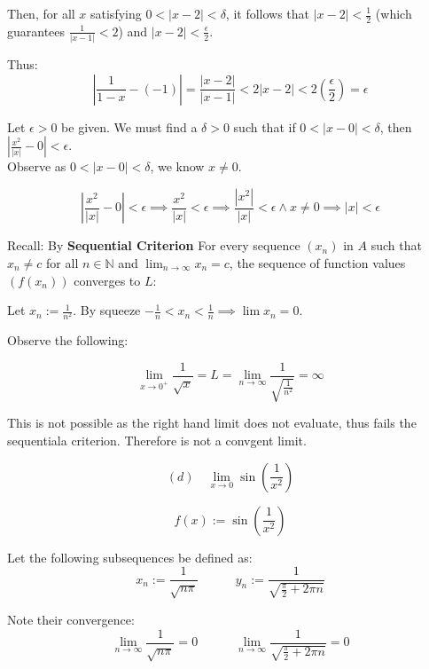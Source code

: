 Then, for all $x$ satisfying $0 < |x-2| < \delta$, it follows that $|x-2| < \frac{1}{2}$ (which guarantees $\frac{1}{|x-1|} < 2$) and $|x-2| < \frac{\epsilon}{2}$.

Thus:
\[
	\left| \frac{1}{1-x} - (-1) \right| = \frac{|x-2|}{|x-1|} < 2|x-2| < 2\left(\frac{\epsilon}{2}\right) = \epsilon
\]

\qq


Let $\epsilon > 0$ be given. We must find a $\delta > 0$ such that if $0 < |x-0| < \delta$, then $\left| \frac{x^2}{|x|} - 0 \right| < \epsilon$. \\

Observe as $0 < |x-0| < \delta$, we know $x \neq 0$. 

\[
  \left| \frac{x^2}{|x|} - 0 \right| < \epsilon \implies 
   \frac{x^2}{|x|}    < \epsilon \implies 
   \frac{|x^2|}{|x|}  < \epsilon \land x \neq 0 \implies 
  |x| < \epsilon 
\] 

\qq


Recall: By \textbf{Sequential Criterion} For every sequence $(x_n)$ in $A$ such that $x_n \neq c$ for all $n \in \mathbb{N}$ and $\lim_{n \to \infty} x_n = c$, the sequence of function values $(f(x_n))$ converges to $L$:

Let $x_n := \frac{1}{n^2}$. By squeeze $ -\frac{1}{n} < x_n < \frac{1}{n} \implies \lim x_n = 0$.

Observe the following:

\[
\lim_{x \to 0^+} \frac{1}{\sqrt{x}} = L = \lim_{n \to \infty} \frac{1}{\sqrt{\frac{1}{n^2}} } = \infty 
\] 

This is not possible as the right hand limit does not evaluate, thus fails the sequentiala criterion. Therefore is not a convgent limit. \qq

\vspace{1em}
\hline

\[
    (d)\quad \lim_{x \to 0} \sin\!\left(\frac{1}{x^2}\right) 
\] 

\[
   f(x) := \sin\!\left(\frac{1}{x^2}\right) 
\] 

Let the following subsequences be defined as:
\[
    x_n := \frac{1}{\sqrt{n\pi}}
    \quad \quad \quad
    y_n := \frac{1}{\sqrt{\frac{\pi}{2} + 2\pi n}}
\] 

Note their convergence:
\[
    \lim_{n \to \infty} \frac{1}{\sqrt{n\pi}} = 0
    \quad \quad \quad
    \lim_{n \to \infty} \frac{1}{\sqrt{\frac{\pi}{2} + 2\pi n}} = 0
\] 

